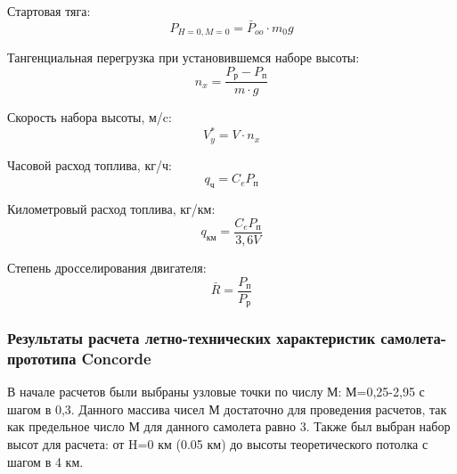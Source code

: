 Стартовая тяга:
\begin{equation}
    \label{eq:Стартовая тяга}
    P_{H=0,M=0} = \bar{P}_{oo} \cdot m_0g
\end{equation}

Тангенциальная перегрузка при установившемся наборе высоты: 
\begin{equation}
    \label{eq:Тангенциальная перегрузка при установившемся наборе высоты}
    n_x = \frac{P_\text{р}-P_\text{п}}{m \cdot g}
\end{equation}

Скорость набора высоты, м/c:
\begin{equation}
    \label{eq:Скорость набора высоты}
    V^*_y = V \cdot n_x
\end{equation}

Часовой расход топлива, кг/ч: 
\begin{equation}
    \label{eq:Часовой расход топлива}
    q_\text{ч} = C_e P_\text{п}
\end{equation}

Километровый расход топлива, кг/км: 
\begin{equation}
    \label{eq:Километровый расход топлива}
    q_\text{км} = \frac{C_e P_\text{п}}{3,6V}
\end{equation}

Степень дросселирования двигателя: 
\begin{equation}
    \label{eq:Степень дросселирования двигателя}
    \bar{R} = \frac{P_\text{п}}{P_\text{р}}
\end{equation}


\subsubsection{Результаты расчета летно-технических характеристик
самолета-прототипа Concorde}
\label{sec:Результаты расчета летно-технических характеристик
самолета-прототипа Concorde}

В начале расчетов были выбраны узловые точки по числу М: М=0,25-2,95 с шагом в 0,3. Данного массива чисел М достаточно для проведения расчетов, так как предельное число М для данного самолета равно 3. Также был выбран набор высот для расчета: от H=0 км (0.05 км) до высоты теоретического потолка с шагом в 4 км.










